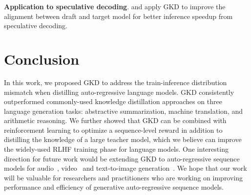 \documentclass{article} %
\begin{document}
\textbf{Application to speculative decoding}.  \citet{zhou2023distillspec} and \citet{liu2023online} apply GKD to improve the alignment between draft and target model for better inference speedup from speculative decoding. 

\vspace{-0.45cm}
\section{Conclusion}
\vspace{-0.35cm}
In this work, we proposed GKD to address the train-inference distribution mismatch when distilling auto-regressive language models. GKD consistently outperformed commonly-used knowledge distillation approaches on three language generation tasks: abstractive summarization, machine translation, and arithmetic reasoning. We further showed that GKD can be combined with reinforcement learning to optimize a sequence-level reward in addition to distilling the knowledge of a large teacher model, which we believe can improve the widely-used RLHF training phase for language models. One interesting direction for future work would be extending GKD  to auto-regressive sequence models for audio~\citep{radford2023robust}, video~\citep{villegas2022phenaki} and text-to-image generation~\citep{yu2022scaling}. We hope that our work will be valuable for researchers and practitioners who are working on improving performance and efficiency of generative auto-regressive sequence models.



\end{document}

